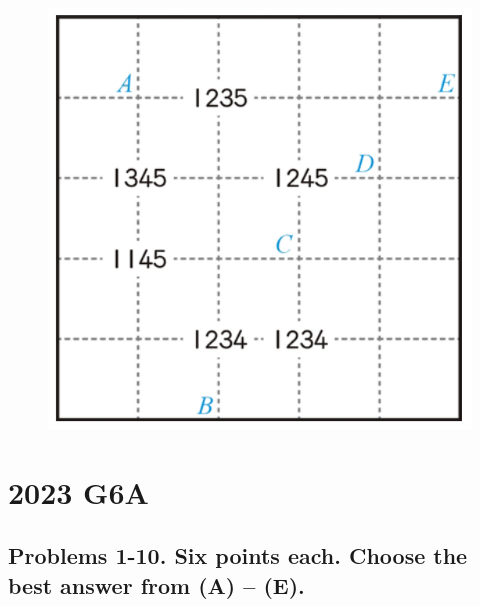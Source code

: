\documentclass[12pt]{scrartcl}
\begin{document}
\begin{enumerate}
    \begin{figure}[h]
        \centering
        \includegraphics[scale=0.8]{StarGen/0Figure/wmi-2021-6b-sudoku-puzzle.png}
    \end{figure}
\end{enumerate}


\section{2023 G6A}
\subsection*{Problems 1-10. Six points each. Choose the best answer from (A) -- (E).}
\end{document}
